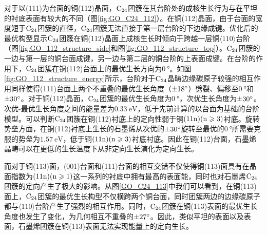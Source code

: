 对于以(111)为台面的铜(112)晶面，$\rm{C_{24}}$团簇在其台阶处的成核生长行为与在平坦的衬底表面有较大的不同（图\ref{fig:GO_C24_112}）。在铜(112)晶面，由于台面的宽度短于$\rm{C_{24}}$团簇的直径，$\rm{C_{24}}$团簇无法直接于第一层台阶的下边缘成键。优化后的最优构型显示$\rm{C_{24}}$团簇在铜(112)晶面上成核生长时倾向于跨越一层铜$\langle 110\rangle$台阶（图\ref{fig:GO_112_structure_side}和图\ref{fig:GO_112_structure_top}）。$\rm{C_{24}}$团簇的一边与第一层的铜台面成键，另一边与第二层的铜台阶的上表面成键。在台阶的作用下，$\rm{C_{24}}$团簇在铜(112)台面上的最优生长方向为$\SI{0}{\degree}$。如图\ref{fig:GO_112_structure_energy}所示，台阶对于$\rm{C_{24}}$晶畴边缘碳原子较强的相互作用同样使得(111)台面上两个不重叠的最优生长角度（$\SI{\pm 18 }{\degree}$）劈裂、偏移至$\SI{0}{\degree}$和$\SI{\pm 30 }{\degree}$。对于铜(112)晶面，$\rm{C_{24}}$团簇的最优生长角度为$\SI{0}{\degree}$，次优生长角度为$\SI{\pm 30 }{\degree}$。次优-最优生长角度之间的能量差为$\SI{0.33}{\electronvolt}$，低于先前计算的以台面为基础的台阶模型。可以判断$\rm{C_{24}}$团簇在铜(112)衬底上的定向性弱于铜$\rm{(11n)(n \geqslant 3)}$衬底。旋转势垒方面，在铜(112)衬底上生长的石墨烯从次优的$\SI{\pm 30 }{\degree}$旋转至最优的$\SI{0}{\degree}$所需要克服的势垒为$\SI{1.57 }{\electronvolt}$，低于铜$\rm{(11n)(n \geqslant 3)}$衬底衬底。因此在铜(112)台面，石墨烯晶畴可以在更低的生长温度下从非定向生长演化为定向生长。

而对于铜(113)面，(001)台面和(111)台面的相互交错不仅使得铜(113)面具有在晶面指数为$\rm{(11n)(n \geqslant 1)}$这一系列的衬底中拥有最高的表面能，同时也对石墨烯$\rm{C_{24}}$团簇的定向产生了极大的影响。从图\ref{GO_C24_113}中我们可以看到，在铜(113)面上，$\rm{C_{24}}$团簇的最优生长构型不仅横跨两个铜台面，同时团簇两边的边缘碳原子都与$\langle 110\rangle$台阶产生了强烈的相互作用。同时，$\rm{C_{24}}$团簇在铜(113)表面的最优生长角度也发生了变化，为几何相互不重叠的$\SI{\pm 27 }{\degree}$。因此，类似平坦的表面以及表面，石墨烯团簇在铜(113)表面无法实现能量上的定向生长。

